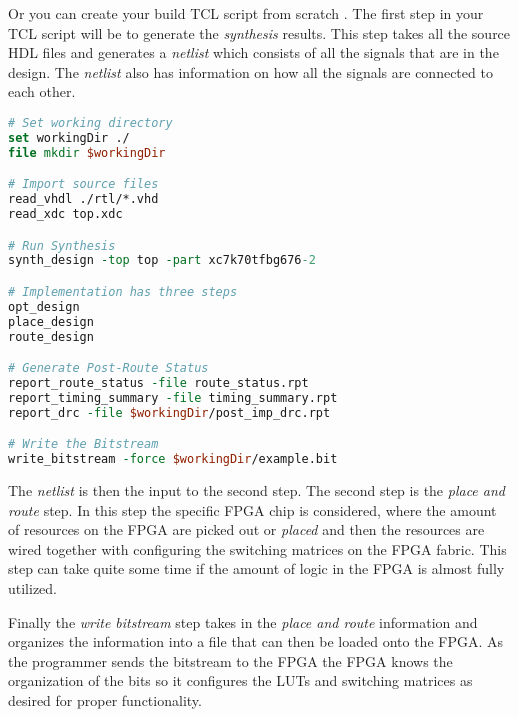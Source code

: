 Or you can create your build \ac{TCL} script from scratch \cite{xiltclug}. The first step in your \ac{TCL} script will be to generate the \emph{synthesis} results. This step takes all the source \ac{HDL} files and generates a \emph{netlist} which consists of all the signals that are in the design. The \emph{netlist} also has information on how all the signals are connected to each other.

\begin{lstlisting}[language=tcl]
# Set working directory
set workingDir ./
file mkdir $workingDir

# Import source files
read_vhdl ./rtl/*.vhd
read_xdc top.xdc

# Run Synthesis
synth_design -top top -part xc7k70tfbg676-2

# Implementation has three steps
opt_design
place_design
route_design

# Generate Post-Route Status
report_route_status -file route_status.rpt
report_timing_summary -file timing_summary.rpt
report_drc -file $workingDir/post_imp_drc.rpt

# Write the Bitstream
write_bitstream -force $workingDir/example.bit
\end{lstlisting}


The \emph{netlist} is then the input to the second step. The second step is the \emph{place and route} step. In this step the specific \ac{FPGA} chip is considered, where the amount of resources on the \ac{FPGA} are picked out or \emph{placed} and then the resources are wired together with configuring the switching matrices on the \ac{FPGA} fabric. This step can take quite some time if the amount of logic in the \ac{FPGA} is almost fully utilized. 

Finally the \emph{write bitstream} step takes in the \emph{place and route} information and organizes the information into a file that can then be loaded onto the \ac{FPGA}. As the programmer sends the bitstream to the \ac{FPGA} the \ac{FPGA} knows the organization of the bits so it configures the \ac{LUT}s and switching matrices as desired for proper functionality. 
	
		
	